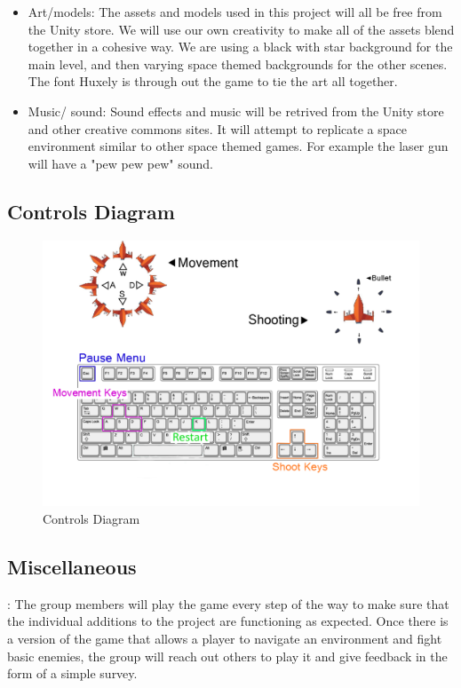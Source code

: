 \documentclass[12pt]{article}       %
\def\hs{\hspace{15pt}}
\begin{document}
\begin{itemize}
\item Art/models: The assets and models used in this project will all be free from the Unity store. We will use our own creativity to make all of the assets blend together in a cohesive way. We are using a black with star background for the main level, and then varying space themed backgrounds for the other scenes. The font Huxely is through out the game to tie the art all together.  

\item Music/ sound: Sound effects and music will be retrived from the Unity store and other creative commons sites. It will attempt to replicate a space environment similar to other space themed games. For example the laser gun will have a "pew pew pew" sound. 

\end{itemize}

\subsection{Controls Diagram}

\begin{figure} [H]
\centering
\includegraphics[width=6.3 in]{ControlDiagramFinal.png}
\caption{Controls Diagram} \label{Controls}
\end{figure}

\subsection{Miscellaneous}
\hs {\bf Testing plans}: The group members will play the game every step of the way to make sure that the individual additions to the project are functioning as expected. Once there is a version of the game that allows a player to navigate an environment and fight basic enemies, the group will reach out others to play it and give feedback in the form of a simple survey. 
\end{document}
